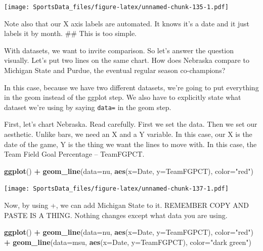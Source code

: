 \documentclass[]{book}
\newenvironment{Shaded}{\begin{snugshade}}{\end{snugshade}}
\newcommand{\KeywordTok}[1]{\textcolor[rgb]{0.13,0.29,0.53}{\textbf{#1}}}
\newcommand{\DataTypeTok}[1]{\textcolor[rgb]{0.13,0.29,0.53}{#1}}
\newcommand{\StringTok}[1]{\textcolor[rgb]{0.31,0.60,0.02}{#1}}
\newcommand{\OperatorTok}[1]{\textcolor[rgb]{0.81,0.36,0.00}{\textbf{#1}}}
\newcommand{\NormalTok}[1]{#1}
\begin{document}
\texttt{[image: SportsData\_files/figure-latex/unnamed-chunk-135-1.pdf]}

Note also that our X axis labels are automated. It knows it's a date and
it just labels it by month. \#\# This is too simple.

With datasets, we want to invite comparison. So let's answer the
question visually. Let's put two lines on the same chart. How does
Nebraska compare to Michigan State and Purdue, the eventual regular
season co-champions?

\begin{Shaded}
\end{Shaded}

In this case, because we have two different datasets, we're going to put
everything in the geom instead of the ggplot step. We also have to
explicitly state what dataset we're using by saying \texttt{data=} in
the geom step.

First, let's chart Nebraska. Read carefully. First we set the data. Then
we set our aesthetic. Unlike bars, we need an X and a Y variable. In
this case, our X is the date of the game, Y is the thing we want the
lines to move with. In this case, the Team Field Goal Percentage --
TeamFGPCT.

\begin{Shaded}
\begin{Highlighting}[]
\KeywordTok{ggplot}\NormalTok{() }\OperatorTok{+}\StringTok{ }\KeywordTok{geom_line}\NormalTok{(}\DataTypeTok{data=}\NormalTok{nu, }\KeywordTok{aes}\NormalTok{(}\DataTypeTok{x=}\NormalTok{Date, }\DataTypeTok{y=}\NormalTok{TeamFGPCT), }\DataTypeTok{color=}\StringTok{"red"}\NormalTok{)}
\end{Highlighting}
\end{Shaded}

\texttt{[image: SportsData\_files/figure-latex/unnamed-chunk-137-1.pdf]}

Now, by using +, we can add Michigan State to it. REMEMBER COPY AND
PASTE IS A THING. Nothing changes except what data you are using.

\begin{Shaded}
\begin{Highlighting}[]
\KeywordTok{ggplot}\NormalTok{() }\OperatorTok{+}\StringTok{ }\KeywordTok{geom_line}\NormalTok{(}\DataTypeTok{data=}\NormalTok{nu, }\KeywordTok{aes}\NormalTok{(}\DataTypeTok{x=}\NormalTok{Date, }\DataTypeTok{y=}\NormalTok{TeamFGPCT), }\DataTypeTok{color=}\StringTok{"red"}\NormalTok{) }\OperatorTok{+}\StringTok{ }\KeywordTok{geom_line}\NormalTok{(}\DataTypeTok{data=}\NormalTok{msu, }\KeywordTok{aes}\NormalTok{(}\DataTypeTok{x=}\NormalTok{Date, }\DataTypeTok{y=}\NormalTok{TeamFGPCT), }\DataTypeTok{color=}\StringTok{"dark green"}\NormalTok{)}
\end{Highlighting}
\end{Shaded}
\end{document}
